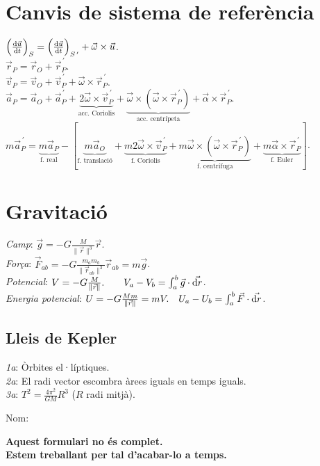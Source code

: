 \documentclass[10pt]{article}
\newcommand{\lp}{\left(}
\newcommand{\rp}{\right)}
\newcommand{\ci}{\textbullet\;}
\begin{document}
\begin{multicols}{3}
\section{Canvis de sistema de referència}
\ci $\lp \frac{\dif \vec{u}}{\dif t} \rp_S=\lp \frac{\dif \vec{u}}{\dif t} \rp_{S^{\, \prime}}+\vec{\omega}\times \vec{u}$. \\
\ci $\vec{r}_P = \vec{r}_O + \vec{r}_{P}^{\, \prime}$. \\
\ci $\vec{v}_P = \vec{v}_O + \vec{v}_{P}^{\, \prime} + \vec{\omega}\times\vec{r}_{P}^{\, \prime}$. \\
\ci $\vec{a}_P = \vec{a}_O + \vec{a}_{P}^{\, \prime} + \underbrace{2\vec{\omega}\times\vec{v}_{P}^{\, \prime}}_{\text{acc. Coriolis}} + \underbrace{\vec{\omega}\times \lp \vec{\omega}\times \vec{r}_{P}^{\, \prime} \rp}_{\text{acc. centrípeta}} + \vec{\alpha}\times\vec{r}_{P}^{\, \prime}$. \\
\ci $m\vec{a}_{P}^{\, \prime} = \underbrace{m\vec{a}_P}_{\text{f. real}} - [ \underbrace{m\vec{a}_O}_{\text{f. translació}} + \underbrace{m2\vec{\omega}\times\vec{v}_{P}^{\, \prime}}_{\text{f. Coriolis}} + \underbrace{m\vec{\omega}\times \lp \vec{\omega}\times \vec{r}_{P}^{\, \prime} \rp}_{\text{f. centrífuga}} + \underbrace{m\vec{\alpha}\times\vec{r}_{P}^{\, \prime}}_{\text{f. Euler}} ]$.


\section{Gravitació}
\emph{Camp}: $\vec{g} = -G \frac{M}{\|\vec{r}\|^3} \vec{r}$. \\
\emph{Força}: $\vec{F}_{ab} = -G \frac{m_a m_b}{\|\vec{r}_{ab}\|^3} \vec{r}_{ab}=m\vec{g}$. \\
\emph{Potencial}: $V = -G \frac{M}{\|\vec{r}\|}. \qquad V_a-V_b = \int_a^b \vec{g} \cdot \vec{\dif r}$. \\
\emph{Energia potencial}: $U = -G \frac{Mm}{\|\vec{r}\|}=mV. \quad U_a-U_b = \int_a^b \vec{F} \cdot \vec{\dif r}$.

\subsection{Lleis de Kepler}
\emph{1a}: Òrbites el·líptiques. \\
\emph{2a}: El radi vector escombra àrees iguals en temps iguals. \\
\emph{3a}: $T^2=\frac{4\pi^2}{GM}R^3$ ($R$ radi mitjà).


\ifland
\noindent\makebox[\linewidth]{\rule{\linewidth}{0.5pt}}
\vspace{3pt}
\raggedleft
{\large Nom: \underline{\hspace{5cm}}}


\end{multicols}
\vspace*{\fill}
\begin{center}
\textbf{\huge Aquest formulari no \'es complet.} \\
\textbf{\huge Estem treballant per tal d'acabar-lo a temps.}
\end{center}
\vspace*{\fill}
\fi
\end{document}
